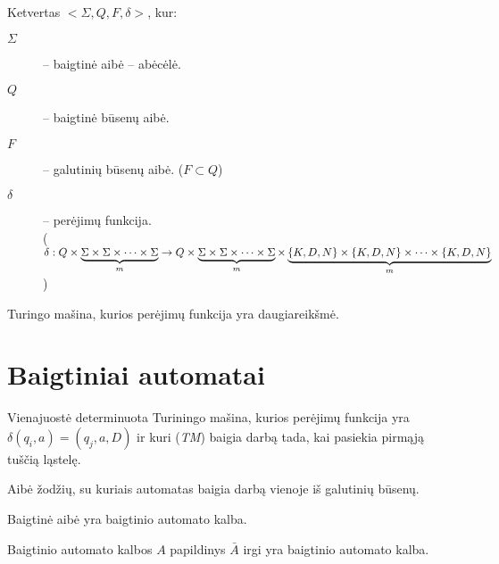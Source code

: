 \begin{defn}
  Ketvertas $<\Sigma,Q,F,\delta>$, kur:
  \begin{description}
    \item[$\Sigma$] – baigtinė aibė – abėcėlė.
    \item[$Q$] – baigtinė būsenų aibė.
    \item[$F$] – galutinių būsenų aibė. ($F \subset Q$)
    \item[$\delta$] – perėjimų funkcija. \\
      ($\delta: Q \times \underbrace{\Sigma \times \Sigma \times \cdots%
        \times \Sigma}_{m} \to Q \times \underbrace{%
          \Sigma \times \Sigma \times \cdots \times \Sigma}_{m}%
        \times \underbrace{
          \{K,D,N\} \times \{K,D,N\} \times \cdots \times \{K,D,N\}}_{m}$)
  \end{description}
\end{defn}

\begin{defn}
  Turingo mašina, kurios perėjimų funkcija yra daugiareikšmė.
\end{defn}


\section{Baigtiniai automatai}

\begin{defn}
  Vienajuostė determinuota Turiningo mašina, kurios perėjimų funkcija
  yra $\delta(q_i, a) = (q_j, a, D)$ ir kuri (\emph{TM}) baigia darbą
  tada, kai pasiekia pirmąją tuščią ląstelę.
\end{defn}

\begin{defn}
  Aibė žodžių, su kuriais automatas baigia darbą vienoje iš galutinių 
  būsenų.
\end{defn}

\begin{prop}
  Baigtinė aibė yra baigtinio automato kalba.
\end{prop}

\begin{prop}
  Baigtinio automato kalbos $A$ papildinys $\bar{A}$ irgi yra baigtinio
  automato kalba.
\end{prop}

